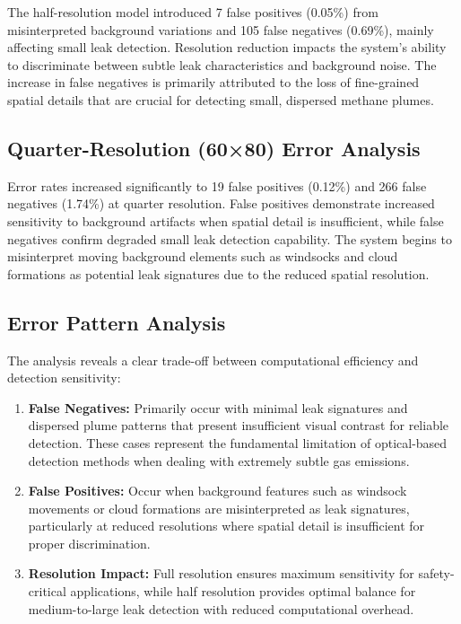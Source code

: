 The half-resolution model introduced 7 false positives (0.05\%) from misinterpreted background variations and 105 false negatives (0.69\%), mainly affecting small leak detection. Resolution reduction impacts the system's ability to discriminate between subtle leak characteristics and background noise. The increase in false negatives is primarily attributed to the loss of fine-grained spatial details that are crucial for detecting small, dispersed methane plumes.

\subsection{Quarter-Resolution (60×80) Error Analysis}

Error rates increased significantly to 19 false positives (0.12\%) and 266 false negatives (1.74\%) at quarter resolution. False positives demonstrate increased sensitivity to background artifacts when spatial detail is insufficient, while false negatives confirm degraded small leak detection capability. The system begins to misinterpret moving background elements such as windsocks and cloud formations as potential leak signatures due to the reduced spatial resolution.

\subsection{Error Pattern Analysis}

The analysis reveals a clear trade-off between computational efficiency and detection sensitivity:

\begin{enumerate}
\item \textbf{False Negatives:} Primarily occur with minimal leak signatures and dispersed plume patterns that present insufficient visual contrast for reliable detection. These cases represent the fundamental limitation of optical-based detection methods when dealing with extremely subtle gas emissions.

\item \textbf{False Positives:} Occur when background features such as windsock movements or cloud formations are misinterpreted as leak signatures, particularly at reduced resolutions where spatial detail is insufficient for proper discrimination.

\item \textbf{Resolution Impact:} Full resolution ensures maximum sensitivity for safety-critical applications, while half resolution provides optimal balance for medium-to-large leak detection with reduced computational overhead.
\end{enumerate}

